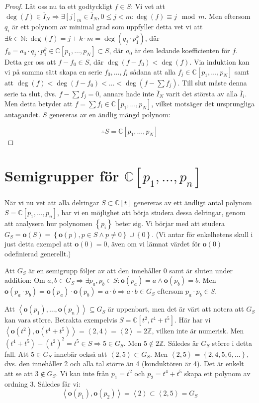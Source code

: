 \begin{proof}
Låt oss nu ta ett godtyckligt $f \in S$: Vi vet att $\deg(f)\in \overline{I}_N \Longrightarrow \exists [j]_m \in \overline{I}_N, 0 \leq j < m : \deg(f) \equiv j \mod{m}$. Men eftersom $q_i$ är ett polynom av minimal grad som uppfyller detta vet vi att $\exists k \in \mathbb{N} : \deg(f) = j + k\cdot m = \deg(q_j\cdot p_1^k)$, där $f_0 = a_0\cdot q_j\cdot p_1^k \in \mathbb{C}[p_1,\ldots,p_N] \subset S$, där $a_0$ är den ledande koefficienten för $f$. Detta ger oss att $f-f_0 \in S$, där $\deg(f-f_0)<\deg(f)$. Via induktion kan vi på samma sätt skapa en serie $f_0,\ldots,f_l$ sådana att alla $f_j\in \mathbb{C}[p_1,\ldots,p_N]$ samt att $\deg(f)<\deg(f-f_0)<\ldots<\deg(f-\sum f_j)$. Till slut måste denna serie ta slut, dvs. $f-\sum f_j=0$, annars hade inte $\overline{I}_N$ varit det största av alla $\overline{I}_i$. Men detta betyder att $f = \sum f_i \in \mathbb{C}[p_1,\ldots,p_N]$, vilket motsäger det ursprungliga antagandet. $S$ genereras av en ändlig mängd polynom:

\[\therefore S=\mathbb{C}[p_1,\ldots,p_N]\]
\end{proof}

\section{Semigrupper för $\mathbb{C}[p_1,\ldots,p_n]$}

När vi nu vet att alla delringar $S \subset \mathbb{C}[t]$ genereras av ett ändligt antal polynom $S=\mathbb{C}[p_1,\ldots,p_n]$, har vi en möjlighet att börja studera dessa delringar, genom att analysera hur polynomen $\left\{p_i\right\}$ beter sig. Vi börjar med att studera $G_S = \mathbf{o}(S) = \left\{\mathbf{o}(p), p \in S \wedge p \neq 0 \right\} \cup \left\{0\right\}$. (Vi antar för enkelhetens skull i just detta exempel att $\mathbf{o}(0)=0$, även om vi lämnat värdet för $\mathbf{o}(0)$ odefinierad generellt.)

Att $G_S$ är en semigrupp följer av att den innehåller $0$ samt är sluten under addition: Om $a,b\in G_S \Longrightarrow \exists p_a, p_b \in S:\mathbf{o}(p_a)=a \wedge \mathbf{o}(p_b)=b$. Men $\mathbf{o}(p_a \cdot p_b) = \mathbf{o}(p_a) \cdot \mathbf{o}(p_b) = a \cdot b \Longrightarrow a \cdot b \in G_S$ eftersom $p_a \cdot p_b \in S$.

Att $\left<\mathbf{o}(p_1),\ldots,\mathbf{o}(p_n)\right> \subseteq G_S$ är uppenbart, men det är värt att notera att $G_S$ kan vara större. Betrakta exempelvis $S=\mathbb{C}[t^2,t^4+t^5]$. Här har vi $\left<\mathbf{o}(t^2),\mathbf{o}(t^4+t^5)\right> = \left<2,4\right>=\left<2\right> = 2\mathbb{Z}$, vilken inte är numerisk. Men $\left(t^4+t^5\right)-\left(t^2\right)^2 = t^5 \in S \Longrightarrow 5 \in G_S$. Men $5 \notin 2\mathbb{Z}$. Således är $G_S$ större i detta fall. Att $5 \in G_S$ innebär också att $\left<2,5\right> \subset G_S$. Men $\left<2,5\right> = \left\{2, 4, 5, 6, \ldots\right\}$, dvs. den innehåller 2 och alla tal större än 4 (konduktören är 4). Det är enkelt att se att $3 \notin G_S$. Vi kan inte från $p_1=t^2$ och $p_2=t^4+t^5$ skapa ett polynom av ordning 3. Således får vi:
\[\left<\mathbf{o}(p_1),\mathbf{o}(p_2)\right> = \left<2\right> \subset \left<2,5\right> = G_S \]

